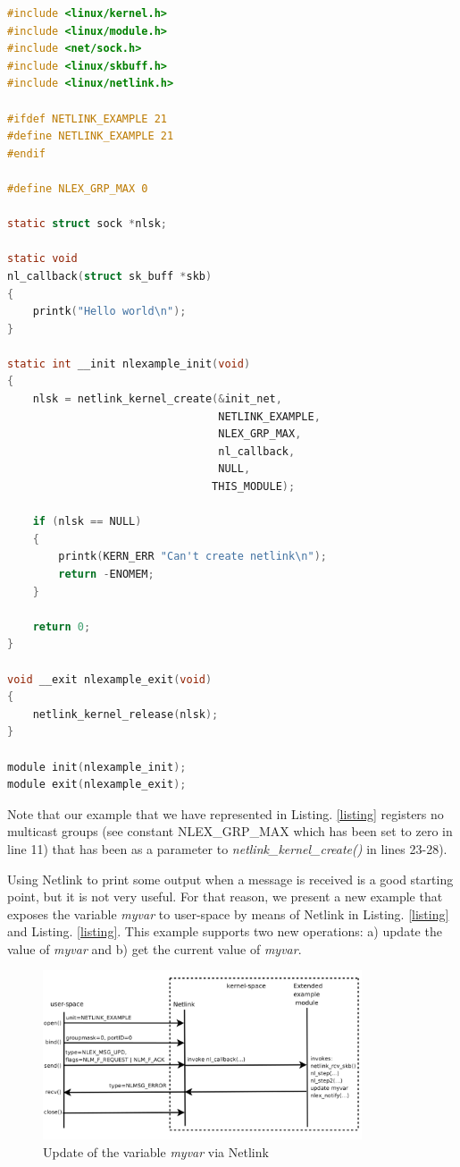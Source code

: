 \documentclass[10pt,onecolumn]{article}
\begin{document}
\begin{lstlisting}[language=C, caption=Simple Netlink kernel module, label=listing1]
#include <linux/kernel.h>
#include <linux/module.h>
#include <net/sock.h>
#include <linux/skbuff.h>
#include <linux/netlink.h>

#ifdef NETLINK_EXAMPLE 21
#define NETLINK_EXAMPLE 21
#endif

#define NLEX_GRP_MAX 0

static struct sock *nlsk;

static void
nl_callback(struct sk_buff *skb)
{
    printk("Hello world\n");
}

static int __init nlexample_init(void)
{
    nlsk = netlink_kernel_create(&init_net,
                                 NETLINK_EXAMPLE,
                                 NLEX_GRP_MAX,
                                 nl_callback,
                                 NULL,
                                THIS_MODULE);

    if (nlsk == NULL)
    {
        printk(KERN_ERR "Can't create netlink\n");
        return -ENOMEM;
    }

    return 0;
}

void __exit nlexample_exit(void)
{
    netlink_kernel_release(nlsk);
}

module init(nlexample_init);
module exit(nlexample_exit);
\end{lstlisting}

Note that our example that we have represented in Listing. \ref{listing} registers no multicast groups (see constant NLEX\_GRP\_MAX which has been set to zero in line 11) that has been as a parameter to \textit{netlink\_kernel\_create()} in lines 23-28).

Using Netlink to print some output when a message is received is a good starting point, but it is not very useful. For that reason, we present a new example that exposes the variable \textit{myvar} to user-space by means of Netlink in Listing. \ref{listing} and Listing. \ref{listing}. This example supports two new operations: a) update the value of \textit{myvar} and b) get the current value of \textit{myvar}.

\begin{figure}[h]
\begin{center}
\includegraphics[height=5cm]{figure/netlink_update_sequence.png}
\end{center}
\caption{Update of the variable \textit{myvar} via Netlink}
\label{fig:netlink_update_sequence}
\end{figure}
\end{document}
